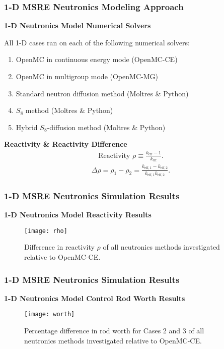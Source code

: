 \begin{frame}
  \frametitle{1-D MSRE Neutronics Modeling Approach}
  \textbf{1-D Neutronics Model Numerical Solvers}
  \vspace{.2cm}

  All 1-D cases ran on each of the following numerical solvers:
  \begin{enumerate}
    \item OpenMC in continuous energy mode (OpenMC-CE)
    \item OpenMC in multigroup mode (OpenMC-MG)
    \item Standard neutron diffusion method (Moltres \& Python)
    \item $S_8$ method (Moltres \& Python)
    \item Hybrid $S_8$-diffusion method (Moltres \& Python)
  \end{enumerate}
  \vspace{.2cm}

  \textbf{Reactivity \& Reactivity Difference}
  \begin{gather}
    \mbox{Reactivity } \rho \equiv \frac{k_\text{eff}-1}{k_\text{eff}}.
  \end{gather}
  \begin{gather}
    \Delta\rho = \rho_1 - \rho_2 =
    \frac{k_{\text{eff},1}-k_{\text{eff},2}}{k_{\text{eff},1}k_{\text{eff},2}}.
  \end{gather}
\end{frame}

\begin{frame}
  \frametitle{1-D MSRE Neutronics Simulation Results}
  \textbf{1-D Neutronics Model Reactivity Results}
  \begin{figure}[h]
    \centering
    \texttt{[image: rho]}
    \caption{Difference in reactivity $\rho$ of all neutronics methods investigated relative
    to OpenMC-CE.}
    \label{fig:1d-rho}
  \end{figure}
\end{frame}

\begin{frame}
  \frametitle{1-D MSRE Neutronics Simulation Results}
  \textbf{1-D Neutronics Model Control Rod Worth Results}
  \begin{figure}[h]
    \centering
    \texttt{[image: worth]}
    \caption{Percentage difference in rod worth for Cases 2 and 3 of all neutronics methods
    investigated relative to OpenMC-CE.}
    \label{fig:1d-worth}
  \end{figure}
\end{frame}

